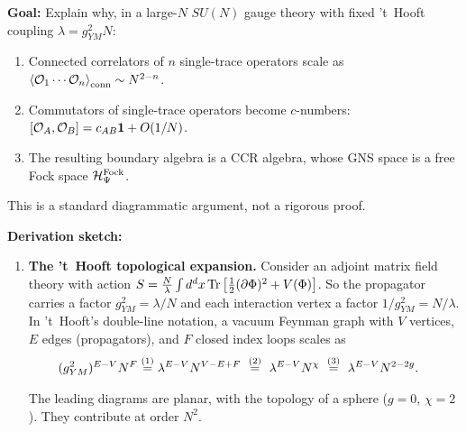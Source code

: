 \begin{keyresult}
\textbf{Goal:} Explain why, in a large-$N$ $SU(N)$ gauge theory with fixed 't~Hooft coupling $\lambda = g_{YM}^2 N$:
\begin{enumerate}
\item Connected correlators of $n$ single-trace operators scale as $\braket{\mathcal{O}_1 \cdots \mathcal{O}_n}_{\text{conn}} \sim N^{2-n}$.
\item Commutators of single-trace operators become $c$-numbers: $[\mathcal{O}_A, \mathcal{O}_B] = c_{AB}\mathbf{1} + O(1/N)$.
\item The resulting boundary algebra is a CCR algebra, whose GNS space is a free Fock space $\mathcal{H}_\Psi^{\text{Fock}}$.
\end{enumerate}
This is a standard diagrammatic argument, not a rigorous proof.

\textbf{Derivation sketch:}
\begin{enumerate}[leftmargin=*]
\item \textbf{The 't~Hooft topological expansion.}
Consider an adjoint matrix field theory with action $S = \frac{N}{\lambda}\int d^d x \operatorname{Tr}\big[\frac{1}{2}(\partial\Phi)^2 + V(\Phi)\big]$. So the propagator carries a factor $g_{YM}^2=\lambda/N$ and each interaction vertex a factor $1/g_{YM}^2=N/\lambda$. In 't~Hooft's double-line notation, a vacuum Feynman graph with $V$ vertices, $E$ edges (propagators), and $F$ closed index loops scales as
\begin{align}
(g_{YM}^2)^{E-V} N^F
&\overset{(1)}{=} \lambda^{E-V} N^{V - E + F}
\ \overset{(2)}{=}\ \lambda^{E-V} N^\chi
\ \overset{(3)}{=}\ \lambda^{E-V} N^{2 - 2g} . \notag
\end{align}
\quad
{}\quad
{}

The leading diagrams are planar, with the topology of a sphere ($g = 0$, $\chi = 2$). They contribute at order $N^2$.


\end{enumerate}
\end{keyresult}
